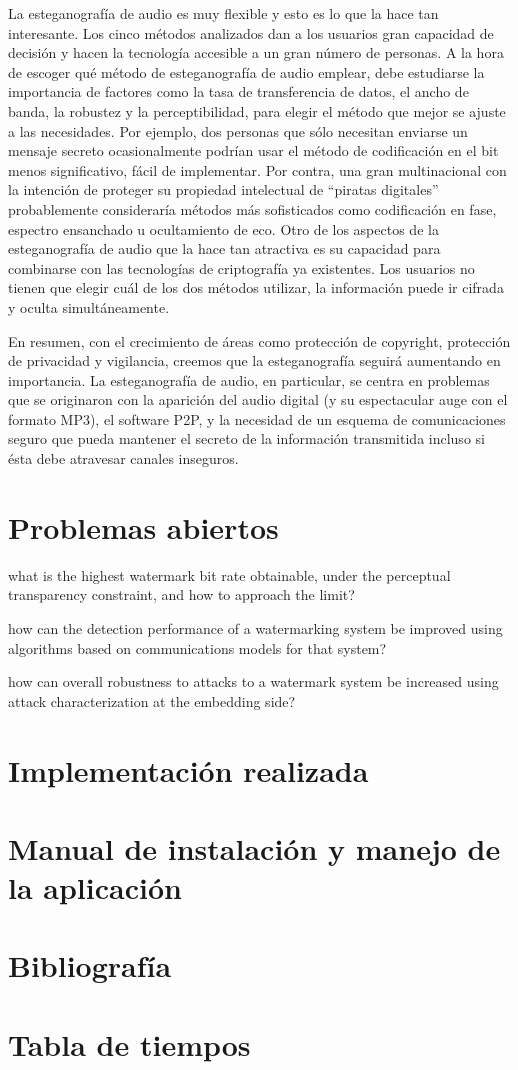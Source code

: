 \documentclass[12pt]{article}
\begin{document}
La esteganografía de audio es muy flexible y esto es lo que la hace tan interesante. Los cinco métodos analizados dan a los usuarios gran capacidad de decisión y hacen la tecnología accesible a un gran número de personas. A la hora de escoger qué método de esteganografía de audio emplear, debe estudiarse la importancia de factores como la tasa de transferencia de datos, el ancho de banda, la robustez y la perceptibilidad, para elegir el método que mejor se ajuste a las necesidades. Por ejemplo, dos personas que sólo necesitan enviarse un mensaje secreto ocasionalmente podrían usar el método de codificación en el bit menos significativo, fácil de implementar. Por contra, una gran multinacional con la intención de proteger su propiedad intelectual de ``piratas digitales'' probablemente consideraría métodos más sofisticados como codificación en fase, espectro ensanchado u ocultamiento de eco. Otro de los aspectos de la esteganografía de audio que la hace tan atractiva es su capacidad para combinarse con las tecnologías de criptografía ya existentes. Los usuarios no tienen que elegir cuál de los dos métodos utilizar, la información puede ir cifrada y oculta simultáneamente.

En resumen, con el crecimiento de áreas como protección de copyright, protección de privacidad y vigilancia, creemos que la esteganografía seguirá aumentando en importancia. La esteganografía de audio, en particular, se centra en problemas que se originaron con la aparición del audio digital (y su espectacular auge con el formato MP3), el software P2P, y la necesidad de un esquema de comunicaciones seguro que pueda mantener el secreto de la información transmitida incluso si ésta debe atravesar canales inseguros.

\section{Problemas abiertos}

what is the highest watermark bit
rate obtainable, under the perceptual transparency constraint, and how to approach the limit?

how can the detection performance of a watermarking system be improved using algorithms based on
communications models for that system?

how can overall robustness to attacks to a watermark
system be increased using attack characterization at the embedding side?

\section{Implementación realizada}

\section{Manual de instalación y manejo de la aplicación}

\section{Bibliografía}

\section{Tabla de tiempos}
\end{document}
